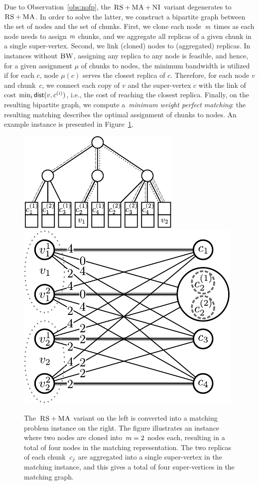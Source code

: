  Due to Observation~\ref{obs:nofp}, the $\textsc{RS}+\textsc{MA}+\textsc{NI}$ variant degenerates to~$\textsc{RS}+\textsc{MA}$.
In order to solve the latter,
we construct a bipartite
graph between the set
of nodes and
the set of chunks.
First, we clone each node~$m$ times
as each node needs to assign
$m$ chunks, and we aggregate all replicas of a given chunk in a
single %
super-vertex.
Second, we link (cloned) nodes to (aggregated) replicas.
In instances without $\textsc{BW}$, assigning any replica to any node is feasible, and hence, for a given assignment $\mu$ of chunks to nodes, the minimum bandwidth is utilized if for each $c$, node $\mu(c)$ serves the closest replica of $c$.
Therefore, for each node $v$ and chunk~$c$, we connect each copy of $v$ and the super-vertex $c$ with the link of cost $\min_i \mathrm{\textsf{dist}}(v,c^{(i)})$, i.e., the cost of reaching the closest replica.
Finally, on the resulting bipartite graph, we compute a~\emph{minimum weight
perfect
matching}:
the resulting matching describes the optimal assignment of chunks to nodes.
An example instance is presented in Figure~\ref{fig:matching}.


\begin{figure}
  \centering
  \includegraphics[width = 0.39\columnwidth]{figs/static-mapping/model_ma_r_cv_boxes}
  \centering
  \hspace{1cm}
  \includegraphics[width =0.39\columnwidth]{figs/static-mapping/matching}
\caption{The~$\textsc{RS}+\textsc{MA}$ variant on the left is converted into a
  matching problem instance on the right.
The figure illustrates
an instance where two nodes are
cloned into~$m = 2$ nodes each,
resulting in a total of four nodes in
the matching representation.
The two replicas of each chunk~$c_j$ are
aggregated into a single super-vertex  in the matching instance, and
this gives a total of four super-vertices in the matching graph.
}
\label{fig:matching}
\end{figure}

